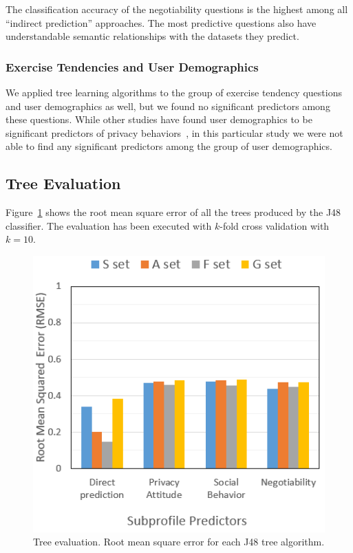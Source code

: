 The classification accuracy of the negotiability questions is the highest among all ``indirect prediction'' approaches. The most predictive questions also have understandable semantic relationships with the datasets they predict.

\subsubsection{Exercise Tendencies and User Demographics}


We applied tree learning algorithms to the group of exercise tendency questions and user demographics as well, but we found no significant predictors among these questions. While other studies have found user demographics to be significant predictors of privacy behaviors~\cite{knijnenburg2013helping}, in this particular study we were not able to find any significant predictors among the group of user demographics. 



\subsection{Tree Evaluation}

Figure~\ref{fig:treermse} shows the root mean square error of all the trees produced by the J48 classifier. The evaluation has been executed with $k$-fold cross validation with $k=10$.

\begin{figure}[ht]
	\includegraphics[width=1\linewidth]{figures/rmse4.png}
	\caption{Tree evaluation. Root mean square error for each J48 tree algorithm.}
	\label{fig:treermse}      
\end{figure}

